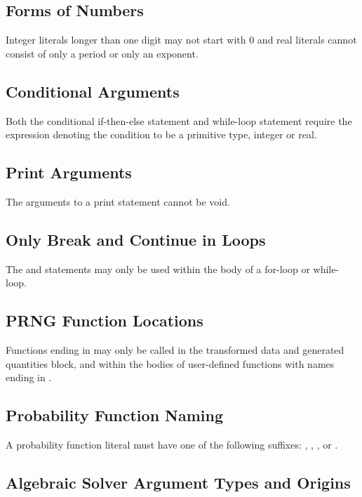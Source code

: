 \subsection{Forms of Numbers}

Integer literals longer than one digit may not start with 0 and real
literals cannot consist of only a period or only an exponent.

\subsection{Conditional Arguments}

Both the conditional if-then-else statement and while-loop statement
require the expression denoting the condition to be a primitive type,
integer or real.

\subsection{Print Arguments}

The arguments to a print statement cannot be void.

\subsection{Only Break and Continue in Loops}

The  and  statements may only be used
within the body of a for-loop or while-loop.

\subsection{PRNG Function Locations}

Functions ending in  may only be called in the transformed
data and generated quantities block, and within the bodies of
user-defined functions with names ending in .

\subsection{Probability Function Naming}

A probability function literal must have one of the following
suffixes: , , , or .

\subsection{Algebraic Solver Argument Types and Origins}

